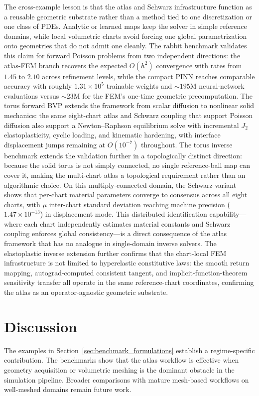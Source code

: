 \documentclass[sort&compress]{svjour3} %
\begin{document}
The cross-example lesson is that the atlas and Schwarz infrastructure function as a reusable geometric substrate rather than a method tied to one discretization or one class of PDEs. Analytic or learned maps keep the solver in simple reference domains, while local volumetric charts avoid forcing one global parametrization onto geometries that do not admit one cleanly. The rabbit benchmark validates this claim for forward Poisson problems from two independent directions: the atlas-FEM branch recovers the expected $O(h^2)$ convergence with rates from $1.45$ to $2.10$ across refinement levels, while the compact PINN reaches comparable accuracy with roughly $1.31\times10^{5}$ trainable weights and ${\sim}195$M neural-network evaluations versus ${\sim}23$M for the FEM's one-time geometric precomputation. The torus forward BVP extends the framework from scalar diffusion to nonlinear solid mechanics: the same eight-chart atlas and Schwarz coupling that support Poisson diffusion also support a Newton--Raphson equilibrium solve with incremental $J_2$ elastoplasticity, cyclic loading, and kinematic hardening, with interface displacement jumps remaining at $O(10^{-7})$ throughout. The torus inverse benchmark extends the validation further in a topologically distinct direction: because the solid torus is not simply connected, no single reference-ball map can cover it, making the multi-chart atlas a topological requirement rather than an algorithmic choice. On this multiply-connected domain, the Schwarz variant shows that per-chart material parameters converge to consensus across all eight charts, with $\mu$ inter-chart standard deviation reaching machine precision ($1.47\times10^{-13}$) in displacement mode. This distributed identification capability---where each chart independently estimates material constants and Schwarz coupling enforces global consistency---is a direct consequence of the atlas framework that has no analogue in single-domain inverse solvers. The elastoplastic inverse extension further confirms that the chart-local FEM infrastructure is not limited to hyperelastic constitutive laws: the smooth return mapping, autograd-computed consistent tangent, and implicit-function-theorem sensitivity transfer all operate in the same reference-chart coordinates, confirming the atlas as an operator-agnostic geometric substrate.





\section{Discussion}
\label{sec:discussion}
The examples in Section~\ref{sec:benchmark_formulations} establish a regime-specific contribution. The benchmarks show that the atlas workflow is effective when geometry acquisition or volumetric meshing is the dominant obstacle in the simulation pipeline. Broader comparisons with mature mesh-based workflows on well-meshed domains remain future work.
\end{document}
